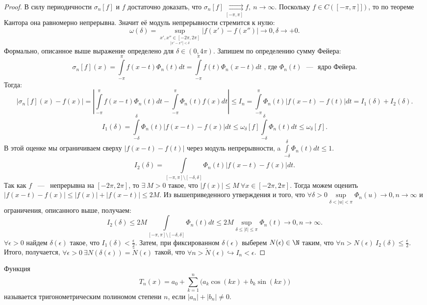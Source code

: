 \begin{proof}
    В силу периодичности $\sigma_n[f]$ и $f$ достаточно доказать, что $\sigma_n[f] \underset{[-\pi, \pi]}{\rightrightarrows} f, \ n \rightarrow \infty$. 
    Поскольку $f \in C([-\pi, \pi]])$, то по теореме Кантора она равномерно непрерывна. Значит её модуль непрерывности стремится к нулю: 
    $$
    \omega(\delta) = \sup\limits_{\underset{|x' - x''| < \delta}{x', x'' \in [-2\pi, 2\pi]}} |f(x') - f(x'')| \rightarrow 0, \delta \rightarrow +0.
    $$
    Формально, описанное выше выражение определено для $\delta \in (0, 4\pi).$ Запишем по определению сумму Фейера: 
    $$
    \sigma_n[f](x) = \int\limits_{-\pi}^{\pi}f(x - t) \Phi_n(t) dt = \int\limits_{-\pi}^{\pi}f(t)\Phi_n(x - t) dt \text{ , где } \Phi_n(t) \text{ ~---~ ядро Фейера}.
    $$
    Тогда: 
    $$
    |\sigma_n[f](x) - f(x)| = \left| \int\limits_{-\pi}^{\pi} f(x - t)\Phi_n(t)dt - \int\limits_{-\pi}^{\pi} \Phi_n(t) f(x) dt \right| \le I_n = \int\limits_{-\pi}^{\pi} \Phi_n(t) |f(x - t) - f(t)| dt = I_1(\delta) + I_2(\delta).
    $$
    $$
    I_1(\delta) = \int\limits_{-\delta}^{\delta}\Phi_n(t) |f(x - t) - f(x)| dt \le \omega_{\delta}[f] \int\limits_{-\delta}^{\delta} \Phi_n(t) dt \le \omega_{\delta}[f].
    $$
    В этой оценке мы ограничиваем сверху $|f(x - t) - f(t)|$ через модуль непрерывности, \newline  a $\int\limits_{-\delta}^{\delta} \Phi_n(t) dt \le 1$.
    $$
    I_2(\delta) = \int\limits_{[-\pi, \pi] \setminus [-\delta, \delta]} \Phi_n(t) |f(x - t) - f(x)| dt.
    $$
    Так как $f$ ~---~ непрерывна на $[-2\pi, 2\pi]$, то $\exists \ M > 0$ такое, что $|f(x)| \le M \ \forall x \in [-2\pi, 2\pi]$. Тогда можем оценить $|f(x - t) - f(x)| \le |f(x)| + |f(x - t)| \le 2M$. \newline
    Из вышеприведенного утверждения и того, что $\forall \delta > 0 \sup\limits_{\delta < |u| < \pi} \Phi_n(u) \rightarrow 0, n \rightarrow \infty$ и ограничения, описанного выше, получаем: 
    $$
    I_2(\delta) \le 2M \int\limits_{[-\pi, \pi] \setminus [-\delta, \delta]} \Phi_n(t) dt \le 2M \sup\limits_{\delta \le |t| \le \pi} \Phi_n(t) \rightarrow 0, n \rightarrow \infty.
    $$
    $\forall \epsilon > 0$ найдем $\delta(\epsilon)$ такое, что $I_1(\delta) < \frac{\epsilon}{2}$. Затем, при фиксированном $\delta(\epsilon)$ выберем $N(\epsilon) \in \N$ таким, что $\forall n > N(\epsilon) \ I_2(\delta) \le \frac{\epsilon}{2}$. \newline 
    Итого, получается, $\forall \epsilon > 0 \ \exists N(\delta(\epsilon)) = \tilde{N}(\epsilon)$ такой, что $\forall n > \tilde{N}(\epsilon) \hookrightarrow I_n < \epsilon$.
\end{proof}
\begin{definition}
    Функция
    \[
        T_n(x) = a_0 + \sum_{k=1}^{n}\bigl(a_k\cos(kx) + b_k\sin(kx)\bigr)
    \]
    называется тригонометрическим полиномом степени \(n\), если $|a_n| + |b_n| \neq 0.$
\end{definition}


